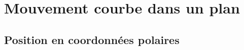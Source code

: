 \documentclass[../../main/main.tex]{subfiles}
\begin{document}
\newpage

%
%
%
%

\section{Mouvement courbe dans un plan}
\subsection{Position en coordonnées polaires}
\end{document}
